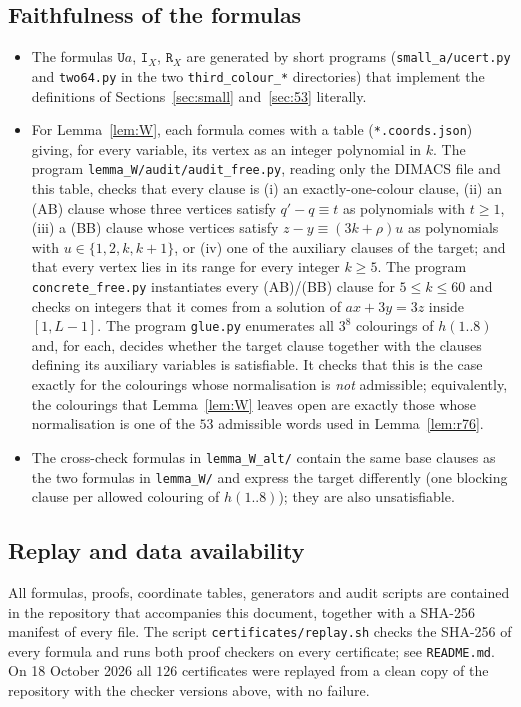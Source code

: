 \documentclass[11pt]{amsart}
\theoremstyle{definition}
\theoremstyle{remark}
\begin{document}
\subsection{Faithfulness of the formulas}
\begin{itemize}
\item The formulas $\mathtt Ua$, $\mathtt I_X$, $\mathtt R_X$ are generated by short programs
(\texttt{small\_a/ucert.py} and \texttt{two64.py} in the two \texttt{third\_colour\_*} directories) that implement the definitions of Sections~\ref{sec:small}
and~\ref{sec:53} literally.
\item For Lemma~\ref{lem:W}, each formula comes with a table (\texttt{*.coords.json}) giving, for every variable, its
vertex as an integer polynomial in $k$. The program \texttt{lemma\_W/audit/audit\_free.py}, reading only the DIMACS
file and this table, checks that every clause is (i) an exactly-one-colour clause, (ii) an (AB) clause whose three
vertices satisfy $q'-q\equiv t$ as polynomials with $t\ge1$, (iii) a (BB) clause whose vertices satisfy
$z-y\equiv(3k+\rho)u$ as polynomials with $u\in\{1,2,k,k+1\}$, or (iv) one of the auxiliary clauses of the target;
and that every vertex lies in its range for every integer $k\ge5$. The program
\texttt{concrete\_free.py} instantiates every (AB)/(BB) clause for $5\le k\le60$ and checks on integers that it
comes from a solution of $ax+3y=3z$ inside $[1,L-1]$. The program \texttt{glue.py} enumerates all $3^8$
colourings of $h(1..8)$ and, for each, decides whether the target clause together with the clauses defining its
auxiliary variables is satisfiable. It checks that this is the case exactly for the colourings whose normalisation
is \emph{not} admissible; equivalently, the colourings that Lemma~\ref{lem:W} leaves open are exactly those whose
normalisation is one of the $53$ admissible words used in Lemma~\ref{lem:r76}.
\item The cross-check formulas in \texttt{lemma\_W\_alt/} contain the same base clauses as the two formulas in
\texttt{lemma\_W/} and express the target differently (one blocking clause per allowed colouring of $h(1..8)$); they are also
unsatisfiable.
\end{itemize}

\subsection{Replay and data availability}
All formulas, proofs, coordinate tables, generators and audit scripts are contained in the repository that
accompanies this document, together with a SHA-256 manifest of every file. The script
\texttt{certificates/replay.sh} checks the SHA-256 of every formula and runs both proof checkers on every
certificate; see \texttt{README.md}. On 18 October 2026 all $126$ certificates were replayed from a clean copy of the
repository with the checker versions above, with no failure.
\end{document}
